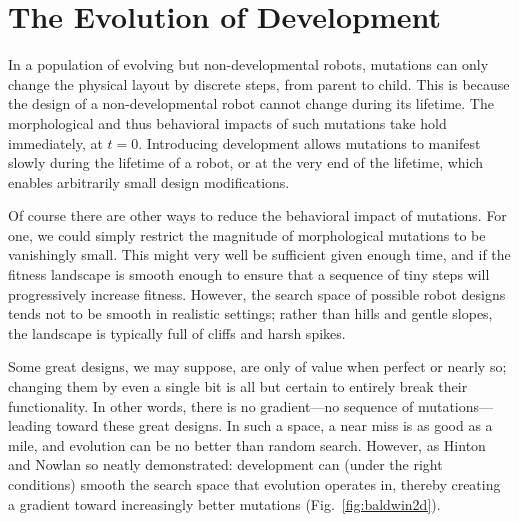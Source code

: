 \section{The Evolution of Development}
\label{sec:evo-devo}

In a population of evolving but non-developmental robots, mutations can only change the physical layout by discrete steps, from parent to child.
This is because the design of a non-developmental robot cannot change during its lifetime.
The morphological and thus behavioral impacts of such mutations take hold immediately, at $t=0$.
Introducing development allows mutations to manifest slowly during the lifetime of a robot, or at the very end of the lifetime, which enables arbitrarily small design modifications.

Of course there are other ways to reduce the behavioral impact of mutations.
For one, we could simply restrict the magnitude of morphological mutations to be vanishingly small.
This might very well be sufficient given enough time, and if the fitness landscape is smooth enough to ensure that a sequence of tiny steps will progressively increase fitness.
However, the search space of possible robot designs tends not to be smooth in realistic settings; rather than hills and gentle slopes, the landscape is typically full of cliffs and harsh spikes. 

Some great designs, we may suppose, are only of value when perfect or nearly so; changing them by even a single bit is all but certain to entirely break their functionality.
In other words, there is no gradient---no sequence of mutations---leading toward these great designs.
In such a space, a near miss is as good as a mile, and evolution can be no better than random search.
However, as Hinton and Nowlan \cite{hinton1987learning} so neatly demonstrated: development can (under the right conditions) smooth the search space that evolution operates in, thereby creating a gradient toward increasingly better mutations (Fig.~\ref{fig:baldwin2d}).


